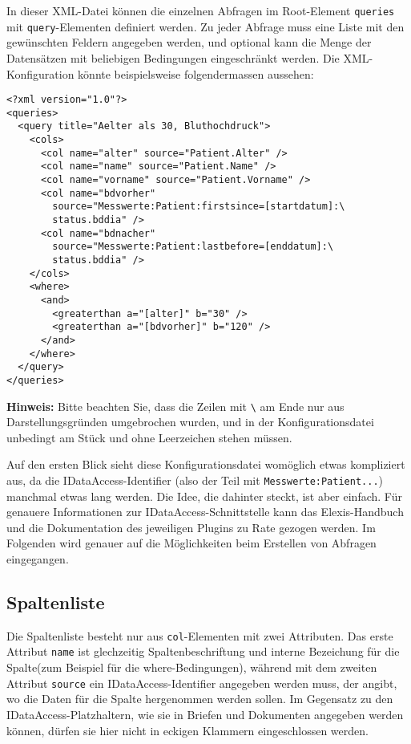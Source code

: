 \documentclass[a4paper]{scrartcl}
\begin{document}
In dieser XML-Datei können die einzelnen Abfragen im Root-Element
\texttt{queries} mit \texttt{query}-Elementen definiert werden.
Zu jeder Abfrage muss eine Liste mit den ge\-wün\-schten Feldern angegeben
werden, und optional kann die Menge der Datensätzen mit beliebigen Bedingungen
eingeschränkt werden. Die XML-Konfiguration könnte bei\-spiels\-wei\-se
fol\-gen\-der\-ma\-ssen aussehen:
\begin{lstlisting}
<?xml version="1.0"?>
<queries>
  <query title="Aelter als 30, Bluthochdruck">
    <cols>
      <col name="alter" source="Patient.Alter" />
      <col name="name" source="Patient.Name" />
      <col name="vorname" source="Patient.Vorname" />
      <col name="bdvorher"
        source="Messwerte:Patient:firstsince=[startdatum]:\
        status.bddia" /> 
      <col name="bdnacher"
        source="Messwerte:Patient:lastbefore=[enddatum]:\
        status.bddia" />
    </cols>
    <where>
      <and>
        <greaterthan a="[alter]" b="30" />
        <greaterthan a="[bdvorher]" b="120" />
      </and>
    </where>
  </query>
</queries>
\end{lstlisting}
\textbf{Hinweis:} Bitte beachten Sie, dass die Zeilen mit
\texttt{\textbackslash} am Ende nur aus Darstellungsgründen umgebrochen wurden,
und in der Konfigurationsdatei unbedingt am Stück und ohne Leerzeichen stehen
müssen.

Auf den ersten Blick sieht diese Konfigurationsdatei womöglich etwas kompliziert
aus, da die IDataAccess-Identifier (also der Teil mit
\texttt{Messwerte:Patient...}) manchmal etwas lang werden. Die Idee, die
dahinter steckt, ist aber einfach. Für genauere In\-for\-ma\-tio\-nen zur
IDataAccess-Schnittstelle kann das Elexis-Handbuch und die Dokumentation des
jeweiligen Plugins zu Rate gezogen werden. Im Folgenden wird genauer auf die
Mög\-lich\-kei\-ten beim Erstellen von Abfragen
eingegangen.

\subsection{Spaltenliste}
Die Spaltenliste besteht nur aus \texttt{col}-Elementen mit zwei Attributen. Das
erste Attribut \texttt{name} ist glechzeitig Spaltenbeschriftung und interne
Bezeichung für die Spalte(zum Beispiel für die where-Bedingungen), während mit
dem zweiten Attribut \texttt{source} ein IDataAccess-Identifier angegeben werden
muss, der angibt, wo die Daten für die Spalte hergenommen werden sollen. Im
Gegensatz zu den IDataAccess-Platzhaltern, wie sie in Briefen und Dokumenten
angegeben werden können, dürfen sie hier nicht in eckigen Klammern
eingeschlossen werden.
\end{document}

